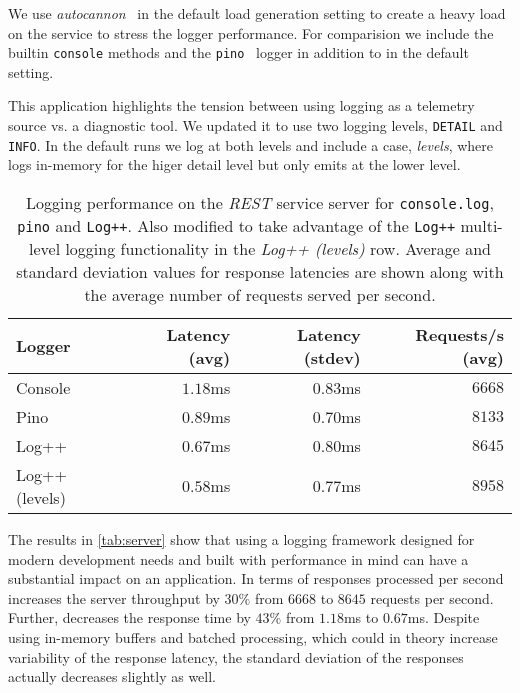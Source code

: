 We use \emph{autocannon}~\cite{autocannon} in the default load generation 
setting to create a heavy load on the service to stress the logger performance.
For comparision we include the builtin \texttt{console} methods 
and the \texttt{pino}~\cite{pino} logger in addition to \projn in the default 
setting.

This application highlights the tension between using logging as a telemetry source 
vs. a diagnostic tool. We updated it to use two logging levels, \texttt{DETAIL} 
and \texttt{INFO}. In the default runs we log at both levels and include a case, 
\emph{levels}, where \projn logs in-memory for the higer detail level but only 
emits at the lower level.

\begin{table}[t]  
    \centering
    {\small
    \begin{tabular}{l | r r r }
    Logger       & Latency (avg) & Latency (stdev) & Requests/s (avg) \\
    \hline
    Console        & $1.18$ms & $0.83$ms & $6668$   \\
    Pino           & $0.89$ms & $0.70$ms & $8133$   \\
    Log++          & $0.67$ms & $0.80$ms & $8645$   \\
    Log++ (levels) & $0.58$ms & $0.77$ms & $8958$   \\
    \end{tabular}
    }
    \vspace{2mm}
    \caption{\small Logging performance on the \emph{REST} service server for \texttt{console.log}, 
    \texttt{pino} and \texttt{Log++}. Also modified to take advantage of the \texttt{Log++} 
    multi-level logging functionality in the \emph{Log++ (levels)} row. Average and 
    standard deviation values for response latencies are shown along with the average 
    number of requests served per second.}
    \label{tab:server}
\end{table}

The results in \autoref{tab:server} show that using a logging framework designed 
for modern development needs and built with performance in mind can have a 
substantial impact on an application. In terms of responses processed per second 
\projn increases the server throughput by $30\%$ from $6668$ to $8645$ requests 
per second. Further, \projn decreases the response time by $43\%$ 
from $1.18$ms to $0.67$ms. Despite using in-memory buffers and batched processing, 
which could in theory increase variability of the response latency, the standard deviation of 
the responses actually decreases slightly as well.

